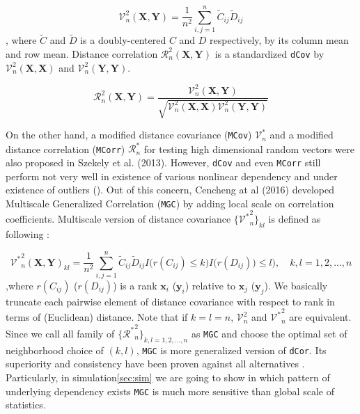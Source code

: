 \documentclass[12pt]{article}
\theoremstyle{definition}
\begin{document}
\begin{equation}	 
\mathcal{V}^2_{n}(\boldsymbol{X}, \boldsymbol{Y}) = \frac{1}{n^2} \sum\limits_{i,j=1}^{n} \tilde{C}_{ij} \tilde{D}_{ij}
\end{equation}
, where $\tilde{C}$ and $\tilde{D}$ is a doubly-centered $C$ and $D$ respectively, by its column mean and row mean. Distance correlation $\mathcal{R}^{2}_{n}(\boldsymbol{X}, \boldsymbol{Y})$ is a standardized \texttt{dCov} by $\mathcal{V}^2_{n}(\boldsymbol{X}, \boldsymbol{X})$ and $\mathcal{V}^2_{n}(\boldsymbol{Y}, \boldsymbol{Y}).$

\begin{equation}	 
\mathcal{R}_{n}^{2} (\boldsymbol{X}, \boldsymbol{Y}) = \frac{\mathcal{V}^2_{n} (\boldsymbol{X}, \boldsymbol{Y}) }{\sqrt{\mathcal{V}^2_{n} (\boldsymbol{X}, \boldsymbol{X}) \mathcal{V}^2_{n} (\boldsymbol{Y}, \boldsymbol{Y}) } }
\end{equation}
	 
On the other hand, a modified distance covariance (\texttt{MCov}) $\mathcal{V}^*_{n}$ and a modified distance correlation (\texttt{MCorr}) $\mathcal{R}^{*}_{n}$ for testing high dimensional random vectors were also proposed in Szekely et al. (2013)\cite{Szekely2013}.   
However, \texttt{dCov} and even \texttt{MCorr} still perform not very well in existence of various nonlinear dependency and under existence of outliers (\cite{Cencheng}). Out of this concern, Cencheng at al (2016) \cite{Cencheng} developed Multiscale Generalized Correlation (\texttt{MGC}) by adding local scale on correlation coefficients. Multiscale version of distance covariance $\{ { {\mathcal{V}^{*}}^2_{n} }   \}_{kl}$ is defined as following : 
	
\begin{equation}
\label{eq:MGC}
{\mathcal{V}^{*}}^2_{n} (\boldsymbol{X}, \boldsymbol{Y})_{kl} = \frac{1}{n^2} \sum\limits_{i,j=1}^{n} \tilde{C}_{ij} \tilde{D}_{ij} I \big( r(C_{ij}) \leq k \big) I \big( r(D_{ij})) \leq l  \big), \quad k,l=1,2,..., n 
\end{equation}
,where $r(C_{ij})$ ($r(D_{ij})$) is a rank $\mathbf{x}_{i}$ ($\mathbf{y}_{i}$) relative to $\mathbf{x}_{j}$ ($\mathbf{y}_{j}$). We basically truncate each pairwise element of distance covariance with respect to rank in terms of (Euclidean) distance. Note that if $k=l=n$, $\mathcal{V}^2_{n}$ and ${\mathcal{V}^{*}}^2_{n}$ are equivalent. Since we call all family of $\{  {\mathcal{R}^{*}}^2_{n} \}_{k,l = 1,2,...,n}$ as \texttt{MGC} and choose the optimal set of neighborhood choice of $(k,l)$, \texttt{MGC} is more generalized version of \texttt{dCor}. Its superiority and consistency have been proven against all alternatives \cite{Cencheng}. Particularly, in simulation\ref{sec:sim} we are going to show in which pattern of underlying dependency exists \texttt{MGC} is much more sensitive than global scale of statistics. 
\end{document}
